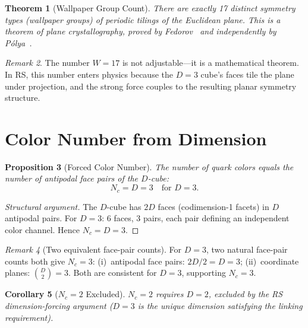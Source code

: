 \documentclass[12pt,a4paper]{article}
\newtheorem{theorem}{Theorem}[section]
\newtheorem{corollary}[theorem]{Corollary}
\newtheorem{proposition}[theorem]{Proposition}
\theoremstyle{definition}
\theoremstyle{remark}
\newtheorem{remark}[theorem]{Remark}
\begin{document}
\begin{theorem}[Wallpaper Group Count]
\label{thm:wallpaper}
There are exactly 17 distinct symmetry types (wallpaper groups)
of periodic tilings of the Euclidean plane.  This is a theorem
of plane crystallography, proved by Fedorov~\cite{Fedorov} and
independently by P\'{o}lya~\cite{Polya1924}.
\end{theorem}

\begin{remark}
The number $W = 17$ is not adjustable---it is a mathematical
theorem.  In RS, this number enters physics because the $D = 3$
cube's faces tile the plane under projection, and the strong
force couples to the resulting planar symmetry structure.
\end{remark}

\section{Color Number from Dimension}
\label{sec:color}

\begin{proposition}[Forced Color Number]
\label{thm:nc}
The number of quark colors equals the number of antipodal face
pairs of the $D$-cube:
\begin{equation}
  \boxed{N_c = D = 3 \quad \text{for } D = 3.}
\end{equation}
\end{proposition}

\begin{proof}[Structural argument]
The $D$-cube has $2D$ faces (codimension-1 facets) in $D$ antipodal
pairs.  For $D = 3$: 6 faces, 3 pairs, each pair defining an
independent color channel.  Hence $N_c = D = 3$.
\end{proof}

\begin{remark}[Two equivalent face-pair counts]
For $D = 3$, two natural face-pair counts both give $N_c = 3$:
(i)~antipodal face pairs: $2D/2 = D = 3$;
(ii)~coordinate planes: $\binom{D}{2} = 3$.
Both are consistent for $D = 3$, supporting $N_c = 3$.
\end{remark}

\begin{corollary}[$N_c = 2$ Excluded]
\label{cor:nc2}
$N_c = 2$ requires $D = 2$, excluded by the RS dimension-forcing
argument ($D = 3$ is the unique dimension satisfying the linking
requirement).
\end{corollary}
\end{document}
